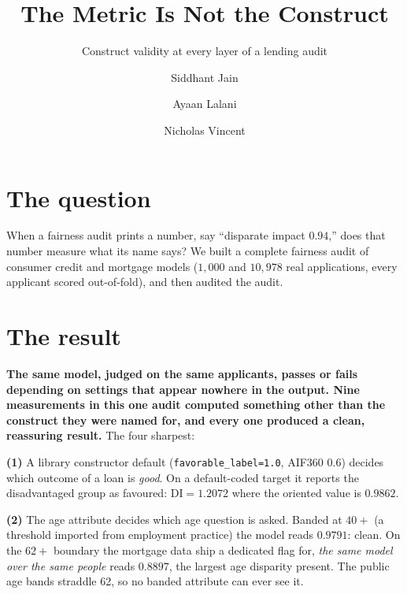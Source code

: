 \documentclass[sigconf,nonacm]{acmart}
\begin{document}
\title{The Metric Is Not the Construct}
\subtitle{Construct validity at every layer of a lending audit}

\author{Siddhant Jain}
\author{Ayaan Lalani}
\author{Nicholas Vincent}
\renewcommand{\shortauthors}{Jain, Lalani, and Vincent}

\maketitle
\thispagestyle{empty}

\section{The question}

When a fairness audit prints a number, say ``disparate impact $0.94$,'' does
that number measure what its name says? We built a complete fairness audit of
consumer credit and mortgage models ($1{,}000$ and $10{,}978$ real
applications, every applicant scored out-of-fold), and then audited the audit.

\section{The result}

\textbf{The same model, judged on the same applicants, passes or fails
depending on settings that appear nowhere in the output. Nine measurements in
this one audit computed something other than the construct they were named
for, and every one produced a clean, reassuring result.} The four sharpest:

\textbf{(1)} A library constructor default (\texttt{favorable\_label=1.0},
AIF360 0.6) decides which outcome of a loan is \emph{good}. On a
default-coded target it reports the disadvantaged group as favoured:
$\mathrm{DI}=1.2072$ where the oriented value is $0.9862$.

\textbf{(2)} The age attribute decides which age question is asked. Banded at
$40{+}$ (a threshold imported from employment practice) the model reads
$0.9791$: clean. On the $62{+}$ boundary the mortgage data ship a dedicated
flag for, \emph{the same model over the same people} reads $\mathbf{0.8897}$,
the largest age disparity present. The public age bands straddle 62, so no
banded attribute can ever see it.
\end{document}

